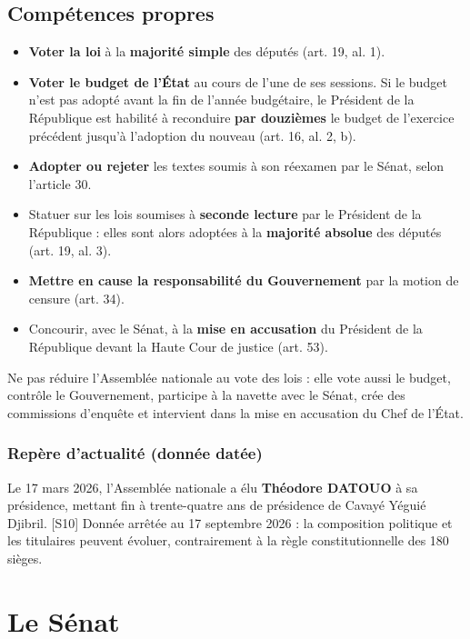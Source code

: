 \documentclass[11pt,a4paper,oneside]{report}
\newcommand{\src}[1]{\textcolor{bluec}{\scriptsize[#1]}}
\begin{document}
\section{Compétences propres}
\begin{itemize}
  \item \textbf{Voter la loi} à la \textbf{majorité simple} des députés (art. 19, al. 1).
  \item \textbf{Voter le budget de l'État} au cours de l'une de ses sessions. Si le budget n'est pas adopté avant la fin de l'année budgétaire, le Président de la République est habilité à reconduire \textbf{par douzièmes} le budget de l'exercice précédent jusqu'à l'adoption du nouveau (art. 16, al. 2, b).
  \item \textbf{Adopter ou rejeter} les textes soumis à son réexamen par le Sénat, selon l'article 30.
  \item Statuer sur les lois soumises à \textbf{seconde lecture} par le Président de la République : elles sont alors adoptées à la \textbf{majorité absolue} des députés (art. 19, al. 3).
  \item \textbf{Mettre en cause la responsabilité du Gouvernement} par la motion de censure (art. 34).
  \item Concourir, avec le Sénat, à la \textbf{mise en accusation} du Président de la République devant la Haute Cour de justice (art. 53).
\end{itemize}
\begin{methodbox}[title={Méthode concours — Erreur fréquente}]
Ne pas réduire l'Assemblée nationale au vote des lois : elle vote aussi le budget, contrôle le Gouvernement, participe à la navette avec le Sénat, crée des commissions d'enquête et intervient dans la mise en accusation du Chef de l'État.
\end{methodbox}
\subsection{Repère d'actualité (donnée datée)}
Le 17 mars 2026, l'Assemblée nationale a élu \textbf{Théodore DATOUO} à sa présidence, mettant fin à trente-quatre ans de présidence de Cavayé Yéguié Djibril. \src{S10} Donnée arrêtée au 17 septembre 2026 : la composition politique et les titulaires peuvent évoluer, contrairement à la règle constitutionnelle des 180 sièges.

\chapter{Le Sénat}
\end{document}
